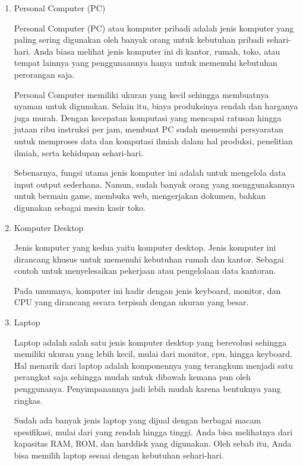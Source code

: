\documentclass[12pt]{article}
\begin{document}
\begin{enumerate}
    \item Personal Computer (PC)
    
    Personal Computer (PC) atau komputer pribadi adalah jenis komputer yang paling sering digunakan oleh banyak orang untuk kebutuhan pribadi sehari-hari. Anda biasa melihat jenis komputer ini di kantor, rumah, toko, atau tempat lainnya yang penggunaannya hanya untuk memenuhi kebutuhan perorangan saja. 

    Personal Computer memiliki ukuran yang kecil sehingga membuatnya nyaman untuk digunakan. Selain itu, biaya produksinya rendah dan harganya juga murah. Dengan kecepatan komputasi yang mencapai ratusan hingga jutaan ribu instruksi per jam, membuat PC sudah memenuhi persyaratan untuk memproses data dan komputasi ilmiah dalam hal produksi, penelitian ilmiah, serta kehidupan sehari-hari. 

    Sebenarnya, fungsi utama jenis komputer ini adalah untuk mengelola data input output sederhana. Namun, sudah banyak orang yang menggunakannya untuk bermain game, membuka web, mengerjakan dokumen, bahkan digunakan sebagai mesin kasir toko. 
    
    \item  Komputer Desktop

    Jenis komputer yang kedua yaitu komputer desktop. Jenis komputer ini dirancang khusus untuk memenuhi kebutuhan rumah dan kantor. Sebagai contoh untuk menyelesaikan pekerjaan atau pengelolaan data kantoran. 

    Pada umumnya, komputer ini hadir dengan jenis keyboard, monitor, dan CPU yang dirancang secara terpisah dengan ukuran yang besar. 
    
    \item Laptop
    
    Laptop adalah salah satu jenis komputer desktop yang berevolusi sehingga memiliki ukuran yang lebih kecil, mulai dari monitor, cpu, hingga keyboard. Hal menarik dari laptop adalah komponennya yang terangkum menjadi satu perangkat saja sehingga mudah untuk dibawah kemana pun oleh penggunanya. Penyimpanannya jadi lebih mudah karena bentuknya yang ringkas. 

    Sudah ada banyak jenis laptop yang dijual dengan berbagai macam spesifikasi, mulai dari yang rendah hingga tinggi. Anda bisa melihatnya dari kapasitas RAM, ROM, dan harddisk yang digunakan. Oleh sebab itu, Anda bisa memilih laptop sesuai dengan kebutuhan sehari-hari.


\end{enumerate}
\end{document}
